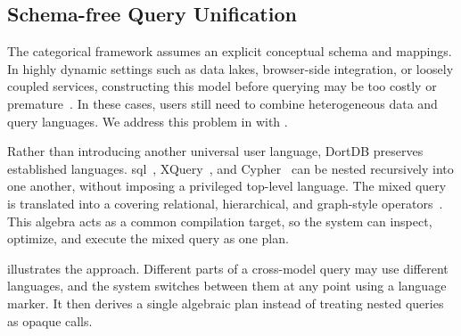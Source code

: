 \subsection{Schema-free Query Unification}

The categorical framework assumes an explicit conceptual schema and mappings. In highly dynamic settings such as data lakes, browser-side integration, or loosely coupled services, constructing this model before querying may be too costly or premature~\citep{CSUR-Jiaheng,AWSDataLake}. In these cases, users still need to combine heterogeneous data and query languages. We address this problem in  with .

Rather than introducing another universal user language, DortDB preserves established languages. \acrshort{sql}~\citep{SQL}, XQuery~\citep{XQuery}, and Cypher~\citep{Cypher} can be nested recursively into one another, without imposing a privileged top-level language. The mixed query is translated into a  covering relational, hierarchical, and graph-style operators~\citep{DBLP:conf/icde/ReSF06, DBLP:conf/edbt/AnglesBGV25, DBLP:conf/sigmod/HolschGS16}. This algebra acts as a common compilation target, so the system can inspect, optimize, and execute the mixed query as one plan.

 illustrates the approach. Different parts of a cross-model query may use different languages, and the system switches between them at any point using a language marker. It then derives a single algebraic plan instead of treating nested queries as opaque calls.


